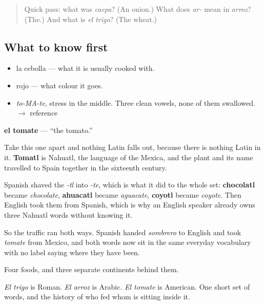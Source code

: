 \label{lesson:ES-C290-tomate}



\begin{quote}
Quick pass: what was \emph{caepa}? (An onion.) What does \emph{ar-} mean in \emph{arroz}? (The.) And what is \emph{el trigo}? (The wheat.)
\end{quote}

\subsection*{What to know first}
\begin{itemize}
\raggedright
  \item la cebolla — what it is usually cooked with.
  \item rojo — what colour it goes.
\end{itemize}

\begin{sounds}
\begin{itemize}
\raggedright
  \item \emph{to-MA-te}, stress in the middle. Three clean vowels, none of them swallowed. $\to$ reference
\end{itemize}
\end{sounds}

\begin{cousinweb}
\textbf{el tomate} — \textquotedblleft{}the tomato.\textquotedblright{}

Take this one apart and nothing Latin falls out, because there is nothing Latin in it. \textbf{Tomatl} is Nahuatl, the language of the Mexica, and the plant and its name travelled to Spain together in the sixteenth century.

Spanish shaved the \emph{-tl} into \emph{-te}, which is what it did to the whole set: \textbf{chocolatl} became \emph{chocolate}, \textbf{ahuacatl} became \emph{aguacate}, \textbf{coyotl} became \emph{coyote}. Then English took them from Spanish, which is why an English speaker already owns three Nahuatl words without knowing it.

So the traffic ran both ways. Spanish handed \emph{sombrero} to English and took \emph{tomate} from Mexico, and both words now sit in the same everyday vocabulary with no label saying where they have been.
\end{cousinweb}

\begin{grammarlens}[title={What you've built}]
Four foods, and three separate continents behind them.

\emph{El trigo} is Roman. \emph{El arroz} is Arabic. \emph{El tomate} is American. One short set of words, and the history of who fed whom is sitting inside it.
\end{grammarlens}

